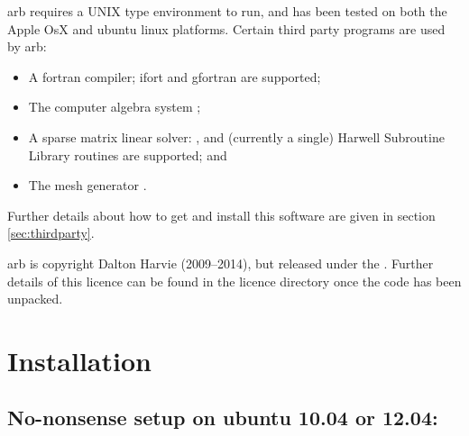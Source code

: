 arb requires a UNIX type environment to run, and has been tested on both the Apple OsX and ubuntu linux platforms.  Certain third party programs are used by arb:
%
\begin{itemize}
\item  A fortran compiler; ifort and gfortran are supported;
\item  The computer algebra system ;
\item  A sparse matrix linear solver: ,  and (currently a single) Harwell Subroutine Library routines are supported; and
\item  The mesh generator .
\end{itemize}
%
Further details about how to get and install this software are given in section \ref{sec:thirdparty}.

arb is copyright Dalton Harvie (2009--2014), but released under the .  Further details of this licence can be found in the licence directory once the code has been unpacked.


\pagebreak
\section{Installation}

\subsection{No-nonsense setup on ubuntu 10.04 or 12.04:}
 
